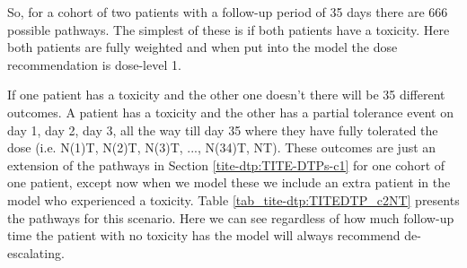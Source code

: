 So, for a cohort of two patients with a follow-up period of 35 days there are 666 possible pathways. The simplest of these is if both patients have a toxicity. Here both patients are fully weighted and when put into the model the dose recommendation is dose-level 1. 

If one patient has a toxicity and the other one doesn't there will be 35 different outcomes. A patient has a toxicity and the other has a partial tolerance event on day 1, day 2, day 3, all the way till day 35 where they have fully tolerated the dose (i.e. N(1)T, N(2)T, N(3)T, ..., N(34)T, NT). These outcomes are just an extension of the pathways in Section \ref{tite-dtp:TITE-DTPs-c1} for one cohort of one patient, except now when we model these we include an extra patient in the model who experienced a toxicity. Table \ref{tab_tite-dtp:TITEDTP_c2NT} presents the pathways for this scenario. Here we can see regardless of how much follow-up time the patient with no toxicity has the model will always recommend de-escalating. 

